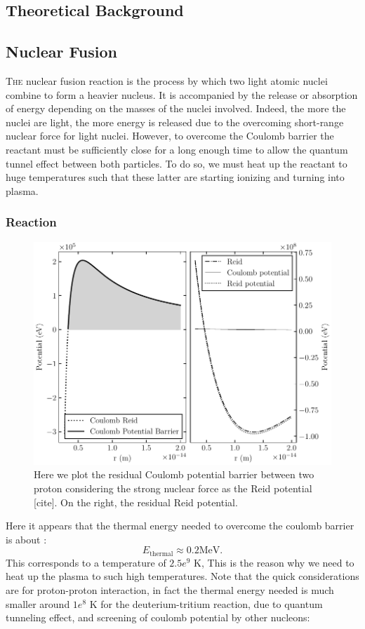 \documentclass[11pt,a4paper]{report}
\begin{document}
\newpage
\fontsize{10}{10}\selectfont
\begin{multicols}{2}
    \chapter{Theoretical Background}
    \section{Nuclear Fusion}
    \lettrine[lines=2, lhang=.3, nindent=0pt]{\color{black} T}{he} nuclear fusion reaction is the process by which two light atomic nuclei combine to form a heavier nucleus. It is accompanied by the release or absorption of energy depending on the masses of the nuclei involved. Indeed, the more the nuclei are light, the  more  energy is released due to the overcoming short-range nuclear force for light nuclei.
    However, to overcome the Coulomb barrier the reactant must be sufficiently close for a long enough time to allow the quantum tunnel effect between both particles. To do so, we must heat up the reactant to huge temperatures such that these latter are starting ionizing and turning into plasma.

    \subsection{Reaction}
    \begin{figure}[H]
        \includegraphics[width=1\linewidth]{./figures/potential_barrier2.pdf}
        \caption{Here we plot the residual Coulomb potential barrier between two proton considering the strong nuclear force as the Reid potential [cite]. On the right, the residual Reid potential.}
        \label{fig:barrier}
    \end{figure}
    Here it appears that the thermal energy needed to overcome the coulomb barrier is about : $$E_{\text{thermal}} \approx 0.2 \text{MeV}.$$This corresponds to a temperature of $2.5e^9$ K,  This is the reason why we need to heat up the plasma to such high temperatures. Note that the quick considerations are for proton-proton interaction, in fact the thermal energy needed is much smaller around $1e^8$ K for the deuterium-tritium reaction, due to quantum tunneling effect, and screening of coulomb potential by other nucleons:


\end{multicols}
\end{document}

